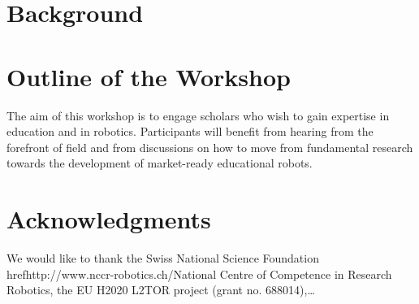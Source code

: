 \documentclass{sig-alternate-05-2015}
\begin{document}


\section{Background}


\section{Outline of the Workshop}
The aim of this workshop is to engage scholars who wish to gain expertise in 
education and in robotics. Participants will benefit from hearing from the 
forefront of field and from discussions on how to move from fundamental research 
towards the development of market-ready educational robots.




\section{Acknowledgments}
We would like to thank the Swiss National Science Foundation 
href{http://www.nccr-robotics.ch/}{National Centre of Competence in Research 
Robotics}, the EU H2020 L2TOR project (grant no. 688014),\dots


  
\end{document}
